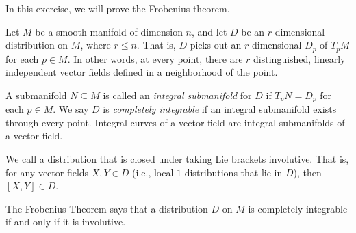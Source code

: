 \documentclass[10pt]{mypackage}
\begin{document}
\begin{problem}[Problem 3]
  In this exercise, we will prove the Frobenius theorem.\newline

  Let $M$ be a smooth manifold of dimension $n$, and let $D$ be an $r$-dimensional distribution on $M$, where $r\leq n$. That is, $D$ picks out an $r$-dimensional $D_p$ of $T_pM$ for each $p\in M$. In other words, at every point, there are $r$ distinguished, linearly independent vector fields defined in a neighborhood of the point.\newline

  A submanifold $N\subseteq M$ is called an \textit{integral submanifold} for $D$ if $T_pN = D_p$ for each $p\in M$. We say $D$ is \textit{completely integrable} if an integral submanifold exists through every point. Integral curves of a vector field are integral submanifolds of a vector field.\newline

  We call a distribution that is closed under taking Lie brackets involutive. That is, for any vector fields $X,Y\in D$ (i.e., local $1$-distributions that lie in $D$), then $\left[ X,Y \right]\in D$.\newline

  The Frobenius Theorem says that a distribution $D$ on $M$ is completely integrable if and only if it is involutive.
\end{problem}
\end{document}
